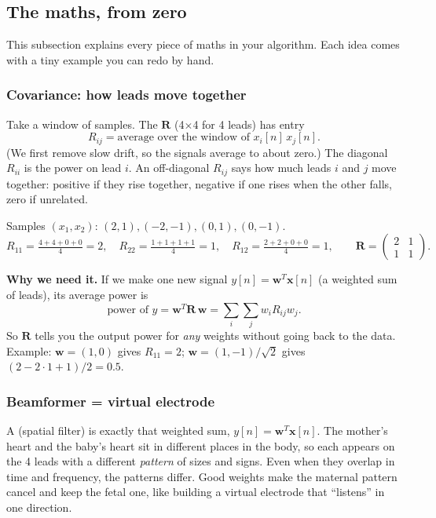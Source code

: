 \documentclass[11pt]{article}
\begin{document}
\subsection{The maths, from zero}
\label{sec:maths}
This subsection explains every piece of maths in your algorithm. Each idea comes with a tiny example you can redo by hand.

\subsubsection{Covariance: how leads move together}
Take a window of samples. The  $\mathbf{R}$ (4$\times$4 for 4 leads) has entry
\[
R_{ij} = \text{average over the window of } x_i[n]\,x_j[n].
\]
(We first remove slow drift, so the signals average to about zero.) The diagonal $R_{ii}$ is the power on lead $i$. An off-diagonal $R_{ij}$ says how much leads $i$ and $j$ move together: positive if they rise together, negative if one rises when the other falls, zero if unrelated.

\begin{simple}
Samples $(x_1,x_2)$: $(2,1), (-2,-1), (0,1), (0,-1)$.
\[
R_{11} = \tfrac{4+4+0+0}{4} = 2,\quad R_{22} = \tfrac{1+1+1+1}{4} = 1,\quad R_{12} = \tfrac{2+2+0+0}{4} = 1,\qquad \mathbf{R} = \begin{pmatrix}2 & 1\\ 1 & 1\end{pmatrix}.
\]
\end{simple}
\textbf{Why we need it.} If we make one new signal $y[n] = \mathbf{w}^T\mathbf{x}[n]$ (a weighted sum of leads), its average power is
\[
\text{power of } y = \mathbf{w}^T\mathbf{R}\,\mathbf{w} = \sum_i\sum_j w_i R_{ij} w_j .
\]
So $\mathbf{R}$ tells you the output power for \emph{any} weights without going back to the data. Example: $\mathbf{w}=(1,0)$ gives $R_{11} = 2$; $\mathbf{w} = (1,-1)/\sqrt2$ gives $(2 - 2\cdot 1 + 1)/2 = 0.5$.

\subsubsection{Beamformer = virtual electrode}
A  (spatial filter) is exactly that weighted sum, $y[n] = \mathbf{w}^T\mathbf{x}[n]$. The mother's heart and the baby's heart sit in different places in the body, so each appears on the 4 leads with a different \emph{pattern} of sizes and signs. Even when they overlap in time and frequency, the patterns differ. Good weights make the maternal pattern cancel and keep the fetal one, like building a virtual electrode that ``listens'' in one direction.
\end{document}
